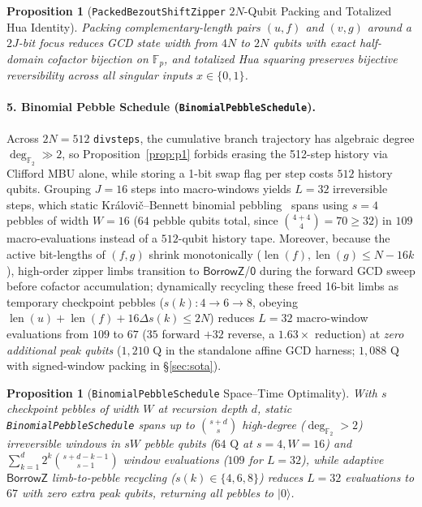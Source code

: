 \documentclass[acmsmall,screen,anonymous]{acmart}
\DeclareRobustCommand{\_}{\ifmmode\text{\char95}\else\char95\penalty0\relax\fi}
\theoremstyle{plain}
\newtheorem{proposition}[theorem]{Proposition}
\newcommand{\CapZero}{\ensuremath{\mathsf{0}}}
\newcommand{\CapBorrowZ}{\ensuremath{\mathsf{BorrowZ}}}
\begin{document}
\begin{proposition}[\texttt{PackedBezoutShiftZipper} $2N$-Qubit Packing and Totalized Hua Identity]
\label{prop:p3_4}
Packing complementary-length pairs $(u, f)$ and $(v, g)$ around a $2J$-bit focus reduces GCD state width from $4N$ to $2N$ qubits with exact half-domain cofactor bijection on $\mathbb{F}_p$, and totalized Hua squaring preserves bijective reversibility across all singular inputs $x \in \{0, 1\}$.
\end{proposition}

\paragraph{5. Binomial Pebble Schedule (\texttt{BinomialPebbleSchedule}).}
Across $2N = 512$ \texttt{divsteps}, the cumulative branch trajectory has algebraic degree $\deg_{\mathbb{F}_2} \gg 2$, so Proposition~\ref{prop:p1} forbids erasing the 512-step history via Clifford MBU alone, while storing a 1-bit swap flag per step costs $512$ history qubits. Grouping $J = 16$ steps into macro-windows yields $L = 32$ irreversible steps, which static Kr\'{a}lovi\v{c}--Bennett binomial pebbling~\cite{bennett1989,kralovic2001} spans using $s = 4$ pebbles of width $W = 16$ ($64$ pebble qubits total, since $\binom{4+4}{4} = 70 \ge 32$) in $109$ macro-evaluations instead of a $512$-qubit history tape. Moreover, because the active bit-lengths of $(f, g)$ shrink monotonically ($\operatorname{len}(f), \operatorname{len}(g) \le N - 16k$), high-order zipper limbs transition to $\CapBorrowZ$/$\CapZero$ during the forward GCD sweep before cofactor accumulation; dynamically recycling these freed 16-bit limbs as temporary checkpoint pebbles ($s(k): 4 \to 6 \to 8$, obeying $\operatorname{len}(u) + \operatorname{len}(f) + 16\Delta s(k) \le 2N$) reduces $L = 32$ macro-window evaluations from $109$ to $67$ ($35$ forward $+ 32$ reverse, a $1.63\times$ reduction) at \emph{zero additional peak qubits} ($1{,}210\text{ Q}$ in the standalone affine GCD harness; $1{,}088\text{ Q}$ with signed-window packing in \S\ref{sec:sota}).

\begin{proposition}[\texttt{BinomialPebbleSchedule} Space--Time Optimality]
\label{prop:p3_5}
With $s$ checkpoint pebbles of width $W$ at recursion depth $d$, static \texttt{BinomialPebbleSchedule} spans up to $\binom{s+d}{s}$ high-degree ($\deg_{\mathbb{F}_2} > 2$) irreversible windows in $s W$ pebble qubits ($64\text{ Q}$ at $s=4, W=16$) and $\sum_{k=1}^{d} 2^k \binom{s+d-k-1}{s-1}$ window evaluations ($109$ for $L = 32$), while adaptive $\CapBorrowZ$ limb-to-pebble recycling ($s(k) \in \{4,6,8\}$) reduces $L = 32$ evaluations to $67$ with zero extra peak qubits, returning all pebbles to $|0\rangle$.
\end{proposition}
\end{document}
